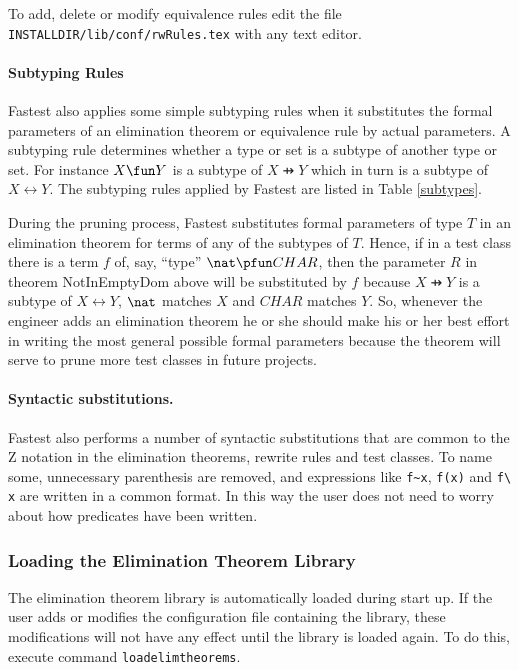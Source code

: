 To add, delete or modify equivalence rules edit the file \verb+INSTALLDIR/lib/conf/rwRules.tex+ with any text editor.

\paragraph{Subtyping Rules} Fastest also applies some simple subtyping rules when it substitutes the formal parameters of an elimination theorem or equivalence rule by actual parameters. A subtyping rule determines whether a type or set is a subtype of another type or set. For instance $X \fun Y$ is a subtype of $X \pfun Y$ which in turn is a subtype of $X \rel Y$. The subtyping rules applied by Fastest are listed in Table \ref{subtypes}.

During the pruning process, Fastest substitutes formal parameters of type $T$ in an elimination theorem for terms of any of the subtypes of $T$. Hence, if in a test class there is a term $f$ of, say, ``type'' $\nat \pfun CHAR$, then the parameter $R$ in theorem NotInEmptyDom above will be substituted by $f$ because $X \pfun Y$ is a subtype of $X \rel Y$, $\nat$ matches $X$ and $CHAR$ matches $Y$. So, whenever the engineer adds an elimination theorem he or she should make his or her best effort in writing the most general possible formal parameters because the theorem will serve to prune more test classes in future projects. 

\paragraph{Syntactic substitutions.} Fastest also performs a number of syntactic substitutions that are common to the Z notation in the elimination theorems, rewrite rules and test classes. To name some, unnecessary parenthesis are removed, and expressions like \verb+f~x+, \verb+f(x)+ and \verb+f\ x+ are written in a common format. In this way the user does not need to worry about how predicates have been written.

\subsubsection{\label{loadelimtheorems}Loading the Elimination Theorem Library}
The elimination theorem library is automatically loaded during start up. If the user adds or modifies the configuration file containing the library, these modifications will not have any effect until the library is loaded again. To do this, execute command \verb+loadelimtheorems+.


